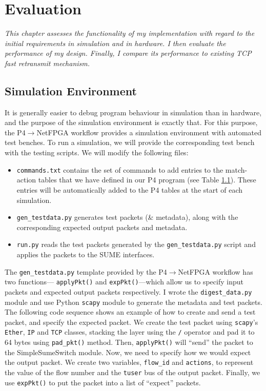 \chapter{Evaluation}
\textit{This chapter assesses the functionality of my implementation with regard to the initial requirements in simulation and in hardware. I then evaluate the performance of my design. Finally, I compare its performance to existing TCP fast retransmit mechanism.}

\section{Simulation Environment}
It is generally easier to debug program behaviour in simulation than in hardware, and the purpose of the simulation environment is exactly that. For this purpose, the P4$\rightarrow$NetFPGA workflow provides a simulation environment with automated test benches. To run a simulation, we will provide the corresponding test bench with the testing scripts. We will modify the following files:

\begin{itemize}
	\item \texttt{commands.txt} contains the set of commands to add entries to the match-action tables that we have defined in our P4 program (see Table \ref{}). These entries will be automatically added to the P4 tables at the start of each simulation. 
	\item \texttt{gen\_testdata.py} generates test packets (\& metadata), along with the corresponding expected output packets and metadata.
	\item \texttt{run.py} reads the test packets generated by the \texttt{gen\_testdata.py} script and applies the packets to the SUME interfaces.
\end{itemize}

The \texttt{gen\_testdata.py} template provided by the P4$\rightarrow$NetFPGA workflow has two functions--- \verb|applyPkt()| and \verb|expPkt()|---which allow us to specify input packets and expected output packets respectively. I wrote the \verb|digest_data.py| module and use Python \texttt{scapy} module to generate the metadata and test packets. The following code sequence shows an example of how to create and send a test packet, and specify the expected packet. We create the test packet using \texttt{scapy}'s \texttt{Ether}, \texttt{IP} and \texttt{TCP} classes, stacking the layer using the \texttt{/} operator and pad it to 64 bytes using \texttt{pad\_pkt()} method. Then, \verb|applyPkt()| will ``send'' the packet to the SimpleSumeSwitch module. Now, we need to specify how we would expect the output packet. We create two variables, \verb|flow_id| and \verb|actions|, to represent the value of the flow number and the \texttt{tuser} bus of the output packet. Finally, we use \verb|expPkt()| to put the packet into a list of ``expect'' packets.

